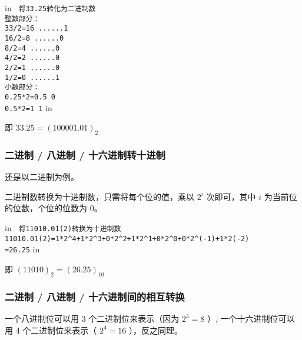  in
\texttt{
将33.25转化为二进制数\\整数部分：\\33/2=16	......1\\16/2=8	......0\\8/2=4	......0\\4/2=2	......0\\2/2=1	......0\\1/2=0	......1\\小数部分：\\0.25*2=0.5	0\\0.5*2=1		1}
 in

即 $33.25 = (100001.01)_2$

\subsubsection{二进制 / 八进制 / 十六进制转十进制}

还是以二进制为例。

二进制数转换为十进制数，只需将每个位的值，乘以 $2^i$ 次即可，其中 $i$ 为当前位的位数，个位的位数为 0。

 in
\texttt{
将11010.01(2)转换为十进制数\\11010.01(2)=1*2^4+1*2^3+0*2^2+1*2^1+0*2^0+0*2^(-1)+1*2(-2)\\        =26.25}
 in

即 $(11010)_2 = (26.25)_{10}$

\subsubsection{二进制 / 八进制 / 十六进制间的相互转换}

一个八进制位可以用 3 个二进制位来表示（因为 $2^3 =8$ ）, 一个十六进制位可以用 4 个二进制位来表示（ $2^4 = 16$ ），反之同理。
